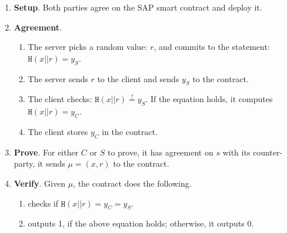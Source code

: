  \begin{enumerate}
 \item\textbf{Setup}.  Both parties agree on the SAP smart contract and deploy it.

  
  \item\textbf{Agreement}.
  \begin{enumerate}
   \item The server picks a random value: $r$, and commits to the statement: $\mathtt{H}(x||r)=y_{\scriptscriptstyle S}$.
   \item The server sends $r$  to the client and sends $y_{\scriptscriptstyle S}$ to the contract. 
   \item The client checks: $\mathtt{H}(x||r)\stackrel{?}=y_{\scriptscriptstyle S}$. If the equation  holds, it computes $\mathtt{H}(x||r)=y_{\scriptscriptstyle C}$.
   \item The client   stores $y_{\scriptscriptstyle C}$ in the contract. 
    \end{enumerate}
   \item\textbf{Prove}. For either $C$ or $S$ to prove, it has agreement on $s$ with its counter-party, it sends $\mu=(x, r)$  to the contract. 
 \item\textbf{Verify}. Given $\mu$, the contract does the following. 
   \begin{enumerate}

   \item checks if $\mathtt{H}(x||r)=y_{\scriptscriptstyle C}=y_{\scriptscriptstyle S}$.
   \item outputs 1, if the above equation holds; otherwise, it outputs 0.
    \end{enumerate}
 \end{enumerate}



